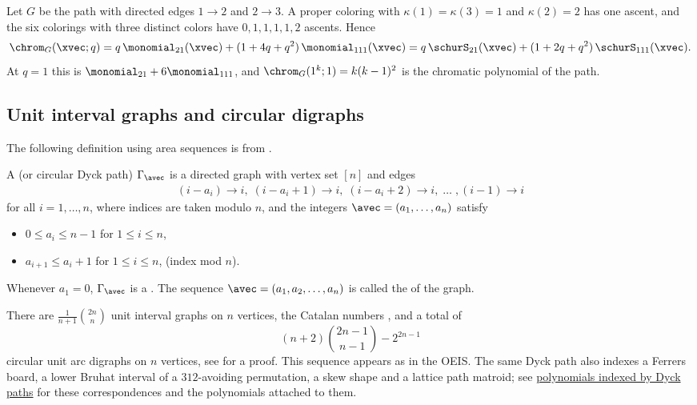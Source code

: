 \begin{example}
Let $G$ be the path with directed edges $1\to2$ and $2\to3$.  A proper
coloring with $\kappa(1)=\kappa(3)=1$ and $\kappa(2)=2$ has one ascent, and
the six colorings with three distinct colors have $0,1,1,1,1,2$ ascents.
Hence
\[
\chrom_G(\xvec;q)=q\,\monomial_{21}(\xvec)+(1+4q+q^2)\,\monomial_{111}(\xvec)
=q\,\schurS_{21}(\xvec)+(1+2q+q^2)\,\schurS_{111}(\xvec).
\]
At $q=1$ this is $\monomial_{21}+6\monomial_{111}$, and
$\chrom_G(1^k;1)=k(k-1)^2$ is the chromatic polynomial of the path.
\end{example}


\subsection[chromaticQuasisymmetricUnitIntervalGraph]{Unit interval graphs and circular digraphs}

The following definition using area sequences is from \cite{AlexanderssonPanova2018}.

A \label{circularUnitArcDigraph}
(or circular Dyck path)
$\Gamma_\avec$ is a directed graph with vertex set $[n]$ and edges
\begin{align}
(i-a_i) \to i, \; (i-a_i + 1) \to i,  \; (i-a_i + 2) \to i, \; \dotsc \; , (i-1) \to i
\end{align}
for all $i = 1,\dotsc,n$, where indices are taken modulo $n$,
and the integers $\avec=(a_1,\dotsc,a_n)$ satisfy

\begin{itemize}
\item $0 \leq a_i \leq n-1 $ for $1 \leq i \leq n$,
\item $a_{i+1} \leq a_{i} + 1$ for $1 \leq i \leq n$, (index mod $n$).
\end{itemize}

Whenever $a_1=0$, $\Gamma_\avec$ is a \label{unitIntervalGraph}.
The sequence $\avec = (a_1,a_2,\dotsc,a_n)$ is called the
\label{areaSequence} of the graph.

There are $\frac{1}{n+1}\binom{2n}{n}$ unit interval graphs on $n$ vertices,
the Catalan numbers ,
and a total of
\[
(n+2)\binom{2n-1}{n-1} - 2^{2n-1}
\]
circular unit arc digraphs on $n$ vertices, see \cite{AlexanderssonLinussonPotka2019} for a proof.
This sequence appears as  in the OEIS.
The same Dyck path also indexes a Ferrers board, a lower Bruhat interval of a
$312$-avoiding permutation, a skew shape and a lattice path matroid; see
\hyperref[dyckPathPolynomials]{polynomials indexed by Dyck paths} for these
correspondences and the polynomials attached to them.


